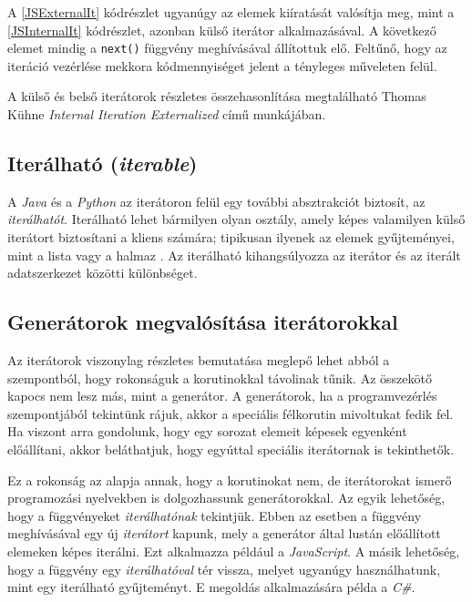 A \ref{JSExternalIt} kódrészlet ugyanúgy az elemek kiíratását valósítja meg, mint a \ref{JSInternalIt} kódrészlet, azonban külső iterátor alkalmazásával. A következő elemet mindig a \texttt{next()} függvény meghívásával állítottuk elő. Feltűnő, hogy az iteráció vezérlése mekkora kódmennyiséget jelent a tényleges műveleten felül.

A külső és belső iterátorok részletes összehasonlítása megtalálható Thomas Kühne \textit{Internal Iteration Externalized} című munkájában.

\subsection{Iterálható (\textit{iterable})}

A \textit{Java} és a \textit{Python} az iterátoron felül egy további absztrakciót biztosít, az \textit{iterálhatót}. Iterálható lehet bármilyen olyan osztály, amely képes valamilyen külső iterátort biztosítani a kliens számára; tipikusan ilyenek az elemek gyűjteményei, mint a lista vagy a halmaz \cite{nvieitvsgen}. Az iterálható kihangsúlyozza az iterátor és az iterált adatszerkezet közötti különbséget.

\subsection{Generátorok megvalósítása iterátorokkal}

Az iterátorok viszonylag részletes bemutatása meglepő lehet abból a szempontból, hogy rokonságuk a korutinokkal távolinak tűnik. Az összekötő kapocs nem lesz más, mint a generátor. A generátorok, ha a programvezérlés szempontjából tekintünk rájuk, akkor a speciális félkorutin mivoltukat fedik fel. Ha viszont arra gondolunk, hogy egy sorozat elemeit képesek egyenként előállítani, akkor beláthatjuk, hogy egyúttal speciális iterátornak is tekinthetők.

Ez a rokonság az alapja annak, hogy a korutinokat nem, de iterátorokat ismerő programozási nyelvekben is dolgozhassunk generátorokkal. Az egyik lehetőség, hogy a függvényeket \textit{iterálhatónak} tekintjük. Ebben az esetben a függvény meghívásával egy új \textit{iterátort} kapunk, mely a generátor által lustán előállított elemeken képes iterálni. Ezt alkalmazza például a \textit{JavaScript}. A másik lehetőség, hogy a függvény egy \textit{iterálhatóval} tér vissza, melyet ugyanúgy használhatunk, mint egy iterálható gyűjteményt. E megoldás alkalmazására példa a \textit{C\#}.

